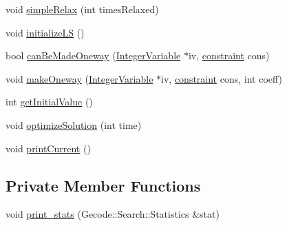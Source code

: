 \begin{DoxyCompactItemize}
\item 
void \hyperlink{class_general_solver_ac8980bcadaf659185f8d1f253e000239}{simple\-Relax} (int times\-Relaxed)
\item 
void \hyperlink{class_general_solver_a2b0f1c903cb82da4dc365c54f99f7dc7}{initialize\-L\-S} ()
\item 
bool \hyperlink{class_general_solver_ad33424f327d023dbd9036f6c00d67016}{can\-Be\-Made\-Oneway} (\hyperlink{class_integer_variable}{Integer\-Variable} $\ast$iv, \hyperlink{_constants_8hpp_ab3a9f5ca3242dd173f530bb9f68fc611}{constraint} cons)
\item 
void \hyperlink{class_general_solver_a791480a81d20c730b3922626b17ef86a}{make\-Oneway} (\hyperlink{class_integer_variable}{Integer\-Variable} $\ast$iv, \hyperlink{_constants_8hpp_ab3a9f5ca3242dd173f530bb9f68fc611}{constraint} cons, int coeff)
\item 
int \hyperlink{class_general_solver_a26335b71277441fd0231e6d59f0da504}{get\-Initial\-Value} ()
\item 
void \hyperlink{class_general_solver_a9450eca3384912647dc14542daff80d0}{optimize\-Solution} (int time)
\item 
void \hyperlink{class_general_solver_ae3a2883d94de6f10d13c815a500e515a}{print\-Current} ()
\end{DoxyCompactItemize}
\subsection*{Private Member Functions}
\begin{DoxyCompactItemize}
\item 
void \hyperlink{class_general_solver_a5dc280bd7c1d8527f3127147faf885d0}{print\-\_\-stats} (Gecode\-::\-Search\-::\-Statistics \&stat)
\end{DoxyCompactItemize}
